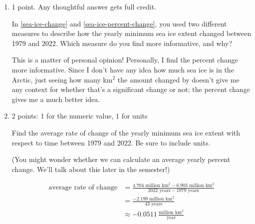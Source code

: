 \documentclass{article}
\begin{document}
\begin{enumerate}
\begin{enumerate}
  \item

    \begin{grading}
      1 point. Any thoughtful answer gets full credit. 
    \end{grading}

    \begin{problem}[\vfill\newpage]
      In \ref{sea-ice-change} and \ref{sea-ice-percent-change}, you used two different measures to describe how the yearly minimum sea ice extent changed between 1979 and 2022. Which measure do you find more informative, and why?
    \end{problem}

    \begin{solution}
      This is a matter of personal opinion! Personally, I find the percent change more informative. Since I don't have any idea how much sea ice is in the Arctic, just seeing how many km$^2$ the amount changed by doesn't give me any context for whether that's a significant change or not; the percent change gives me a much better idea. 
    \end{solution}

  \item \label{sea-ice-average-rate-of-change}

    \begin{grading}
      2 points: 1 for the numeric value, 1 for units
    \end{grading}

    \begin{problem}[\vfill]
      Find the average rate of change of the yearly minimum sea ice extent with respect to time between 1979 and 2022. Be sure to include units.
    \end{problem}

    \begin{problemonly}
      (You might wonder whether we can calculate an average yearly percent change. We'll talk about this later in the semester!)
    \end{problemonly}

    \begin{solution}
      \begin{align*}
          \text{average rate of change} &= \frac{4.704 \text{ million km$^2$} - 
            6.903 \text{ million km$^2$}}{2022 \text{ years} - 1979 \text{ years}} \\
            &= \frac{-2.199 \text{ million km$^2$}}{43 \text{ years}} \\
            &\approx -0.0511\, \frac{\text{million km$^2$}}{\text{year}}
      \end{align*}
    \end{solution}


\end{enumerate}
\end{enumerate}
\end{document}
